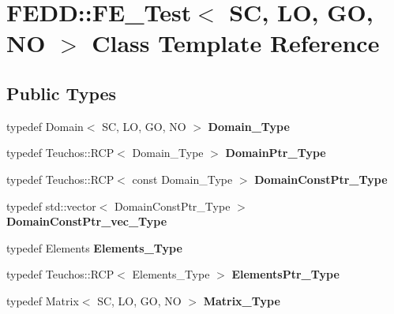 \hypertarget{classFEDD_1_1FE__Test}{}\section{F\+E\+DD\+:\+:F\+E\+\_\+\+Test$<$ SC, LO, GO, NO $>$ Class Template Reference}
\label{classFEDD_1_1FE__Test}
\subsection*{Public Types}
\begin{DoxyCompactItemize}
\item 
\mbox{\label{classFEDD_1_1FE__Test_a5e414af507a141db0961c32bf6b19825}} 
typedef Domain$<$ SC, LO, GO, NO $>$ {\bfseries Domain\+\_\+\+Type}
\item 
\mbox{\label{classFEDD_1_1FE__Test_a1020475c408a64c7926feb8dded7f0c3}} 
typedef Teuchos\+::\+R\+CP$<$ Domain\+\_\+\+Type $>$ {\bfseries Domain\+Ptr\+\_\+\+Type}
\item 
\mbox{\label{classFEDD_1_1FE__Test_a0a941851908a1e68d1554f8b28a7c72a}} 
typedef Teuchos\+::\+R\+CP$<$ const Domain\+\_\+\+Type $>$ {\bfseries Domain\+Const\+Ptr\+\_\+\+Type}
\item 
\mbox{\label{classFEDD_1_1FE__Test_a3345ab320c9e19d77dc7fec9645da0d0}} 
typedef std\+::vector$<$ Domain\+Const\+Ptr\+\_\+\+Type $>$ {\bfseries Domain\+Const\+Ptr\+\_\+vec\+\_\+\+Type}
\item 
\mbox{\label{classFEDD_1_1FE__Test_a73f1a4ecb41cbeec1be473d71efe022d}} 
typedef Elements {\bfseries Elements\+\_\+\+Type}
\item 
\mbox{\label{classFEDD_1_1FE__Test_af8f5bc3cb82c5d60a3a63b1e5c89a678}} 
typedef Teuchos\+::\+R\+CP$<$ Elements\+\_\+\+Type $>$ {\bfseries Elements\+Ptr\+\_\+\+Type}
\item 
\mbox{\label{classFEDD_1_1FE__Test_ab21a3d554ec8bf6763a7dabcbe800b35}} 
typedef Matrix$<$ SC, LO, GO, NO $>$ {\bfseries Matrix\+\_\+\+Type}

\end{DoxyCompactItemize}
